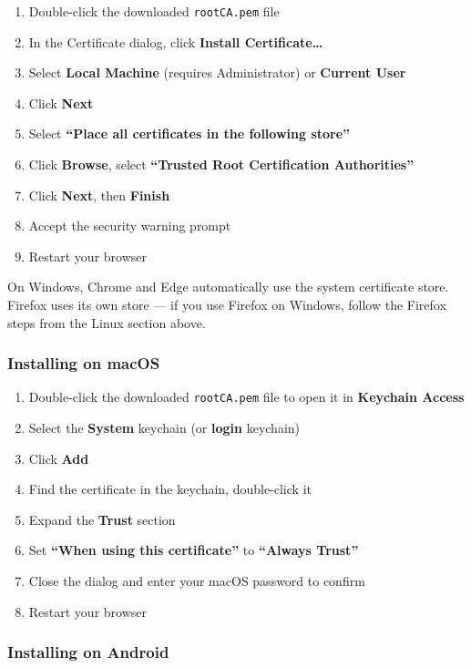 \documentclass[12pt,a4paper]{article}
\begin{document}
\begin{enumerate}
  \item Double-click the downloaded \texttt{rootCA.pem} file
  \item In the Certificate dialog, click \textbf{Install Certificate\ldots}
  \item Select \textbf{Local Machine} (requires Administrator) or \textbf{Current User}
  \item Click \textbf{Next}
  \item Select \textbf{``Place all certificates in the following store''}
  \item Click \textbf{Browse}, select \textbf{``Trusted Root Certification Authorities''}
  \item Click \textbf{Next}, then \textbf{Finish}
  \item Accept the security warning prompt
  \item Restart your browser
\end{enumerate}

\begin{tipbox}
On Windows, Chrome and Edge automatically use the system certificate store. Firefox uses its own store --- if you use Firefox on Windows, follow the Firefox steps from the Linux section above.
\end{tipbox}

\subsubsection{Installing on macOS}

\begin{enumerate}
  \item Double-click the downloaded \texttt{rootCA.pem} file to open it in \textbf{Keychain Access}
  \item Select the \textbf{System} keychain (or \textbf{login} keychain)
  \item Click \textbf{Add}
  \item Find the certificate in the keychain, double-click it
  \item Expand the \textbf{Trust} section
  \item Set \textbf{``When using this certificate''} to \textbf{``Always Trust''}
  \item Close the dialog and enter your macOS password to confirm
  \item Restart your browser
\end{enumerate}


\subsubsection{Installing on Android}
\end{document}
